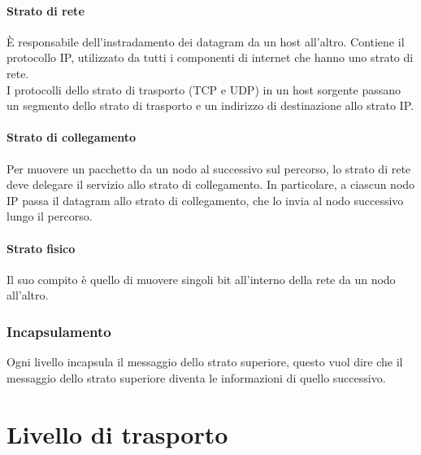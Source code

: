 \documentclass[11pt,a4paper]{article}
\begin{document}
\paragraph{Strato di rete}
È responsabile dell'instradamento dei datagram da un host all'altro. Contiene il protocollo IP, utilizzato da tutti i componenti di internet che hanno uno strato di rete. \\
I protocolli dello strato di trasporto (TCP e UDP) in un host sorgente passano un segmento dello strato di trasporto e un indirizzo di destinazione allo strato IP.
\paragraph{Strato di collegamento}
Per muovere un pacchetto da un nodo al successivo sul percorso, lo strato di rete deve delegare il servizio allo strato di collegamento. In particolare, a ciascun nodo IP passa il datagram allo strato di collegamento, che lo invia al nodo successivo lungo il percorso.
\paragraph{Strato fisico}
Il suo compito è quello di muovere singoli bit all'interno della rete da un nodo all'altro.

\subsubsection{Incapsulamento}
Ogni livello incapsula il messaggio dello strato superiore, questo vuol dire che il messaggio dello strato superiore diventa le informazioni di quello successivo.
\pagebreak

\section{Livello di trasporto}
\end{document}
